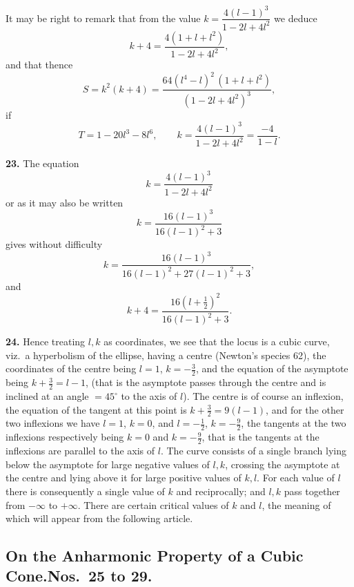 \documentclass[11pt,a4paper]{article}
\begin{document}
It may be right to remark that from the value $k = \dfrac{4(l - 1)^{3}}{1 - 2l + 4l^{2}}$ we deduce
\[
k + 4 = \frac{4(1 + l + l^{2})}{1 - 2l + 4l^{2}},
\]
and that thence
\[
S = k^{2}(k + 4) = \frac{64(l^{4} - l)^{2}\,(1 + l + l^{2})}{(1 - 2l + 4l^{2})^{3}},
\]
if
\[
T = 1 - 20l^{3} - 8l^{6},\qquad k = \frac{4(l - 1)^{3}}{1 - 2l + 4l^{2}} = \frac{-4}{1 - l}.
\]

\textbf{23.} The equation
\[
k = \frac{4(l - 1)^{3}}{1 - 2l + 4l^{2}}
\]
or as it may also be written
\[
k = \frac{16(l - 1)^{3}}{16(l - 1)^{2} + 3}
\]
gives without difficulty
\[
k = \frac{16(l - 1)^{3}}{16(l - 1)^{2} + 27(l - 1)^{2} + 3},
\]
and
\[
k + 4 = \frac{16(l + \tfrac{1}{2})^{2}}{16(l - 1)^{2} + 3}.
\]

\textbf{24.} Hence treating $l, k$ as coordinates, we see that the locus is a cubic curve, viz.\ a hyperbolism of the ellipse, having a centre (Newton's species 62), the coordinates of the centre being $l = 1$, $k = -\tfrac{3}{2}$, and the equation of the asymptote being $k + \tfrac{3}{2} = l - 1$, (that is the asymptote passes through the centre and is inclined at an angle $= 45^{\circ}$ to the axis of $l$). The centre is of course an inflexion, the equation of the tangent at this point is $k + \tfrac{3}{2} = 9(l - 1)$, and for the other two inflexions we have $l = 1$, $k = 0$, and $l = -\tfrac{1}{2}$, $k = -\tfrac{9}{2}$, the tangents at the two inflexions respectively being $k = 0$ and $k = -\tfrac{9}{2}$, that is the tangents at the inflexions are parallel to the axis of $l$. The curve consists of a single branch lying below the asymptote for large negative values of $l, k$, crossing the asymptote at the centre and lying above it for large positive values of $k, l$. For each value of $l$ there is consequently a single value of $k$ and reciprocally; and $l, k$ pass together from $-\infty$ to $+\infty$. There are certain critical values of $k$ and $l$, the meaning of which will appear from the following article.

\subsection*{On the Anharmonic Property of a Cubic Cone.\quad Nos.\ 25 to 29.}
\end{document}
